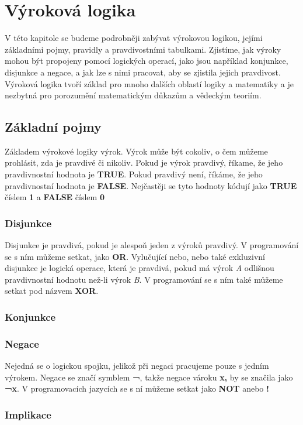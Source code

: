 
\newpage
\chapter{Výroková logika}
V této kapitole se budeme podrobněji zabývat výrokovou logikou, jejími základními pojmy, pravidly a pravdivostními tabulkami.
Zjistíme, jak výroky mohou být propojeny pomocí logických operací, jako jsou například konjunkce, disjunkce a negace, a jak
lze s nimi pracovat, aby se zjistila jejich pravdivost. Výroková logika tvoří základ pro mnoho dalších oblastí logiky a matematiky
a je nezbytná pro porozumění matematickým důkazům a vědeckým teoriím.
    \section{Základní pojmy}
Základem výrokové logiky výrok. Výrok může být cokoliv, o čem můžeme prohlásit, zda je pravdivé či nikoliv. Pokud je výrok pravdivý,
říkame, že jeho pravdivnostní hodnota je \textbf{TRUE}. Pokud pravdivý není, říkáme, že jeho pravdivnostní hodnota je \textbf{FALSE}.
Nejčastěji se tyto hodnoty kódují jako \textbf{TRUE} číslem \textbf{1} a \textbf{FALSE} číslem \textbf{0}
        \subsection{Disjunkce}
Disjunkce je pravdivá, pokud je alespoň jeden z výroků pravdivý. V programování se s ním můžeme setkat, jako \textbf{OR}. Vylučující nebo,
nebo také exkluzivní disjunkce je logická operace, která je pravdivá, pokud má výrok \emph{A} odlišnou pravdivnostní hodnotu než-li výrok
\emph{B}. V programování se s ním také můžeme setkat pod názvem \textbf{XOR}.

        \subsection{Konjunkce}

        \subsection{Negace }
Nejedná se o logickou spojku, jelikož při negaci pracujeme pouze s jedním výrokem. Negace se značí symblem \textbf{¬}, takže negace vároku
\textbf{x,} by se značila jako \textbf{¬x}. V programovacích jazycích se s ní můžeme setkat jako \textbf{NOT} anebo \textbf{!}
        \subsection{Implikace}
